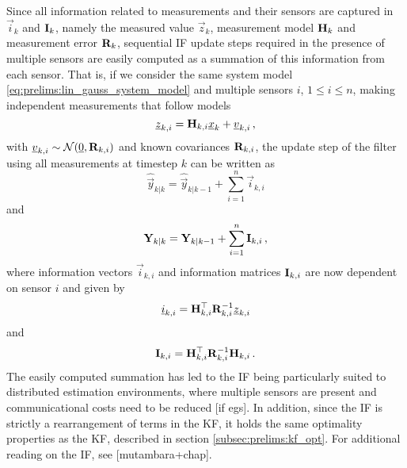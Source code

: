 Since all information related to measurements and their sensors are captured in $\vec{i}_k$ and ${{\mathbf{I}}}_k$, namely the measured value $\vec{z}_k$, measurement model ${{\mathbf{H}}}_k$ and measurement error ${{\mathbf{R}}}_k$, sequential IF update steps required in the presence of multiple sensors are easily computed as a summation of this information from each sensor. That is, if we consider the same system model \eqref{eq:prelims:lin_gauss_system_model} and multiple sensors $i$, $1\leq i\leq n$, making independent measurements that follow models
\begin{equation}
    {\underline{z}}_{k,i} = {{\mathbf{H}}}_{k,i} {\underline{x}}_k + {\underline{v}}_{k,i}\,,
\end{equation}
with ${\underline{v}}_{k, i}\sim\mathcal{N}({\underline{0}},{{\mathbf{R}}}_{k, i})$ and known covariances ${{\mathbf{R}}}_{k, i}$, the update step of the filter using all measurements at timestep $k$ can be written as
\begin{equation}\label{eq:prelims:if_info_vec_update}
    \hat{\vec{y}}_{k|k} = \hat{\vec{y}}_{k|k-1} + \sum_{i=1}^n\vec{i}_{k,i}
\end{equation}
and
\begin{equation}\label{eq:prelims:if_info_mat_update}
    {\ensuremath{{\mathbf{Y}}}}_{k|k} = {{\mathbf{Y}}}_{k|k-1} + \sum_{i=1}^n{{\mathbf{I}}}_{k,i}\,,
\end{equation}
where information vectors $\vec{i}_{k,i}$ and information matrices ${{\mathbf{I}}}_{k,i}$ are now dependent on sensor $i$ and given by
\begin{equation}\label{eq:prelims:if_measurement_vec_defn}
    {\underline{i}}_{k,i} = {{\mathbf{H}}}_{k,i}^\top{\ensuremath{{\mathbf{R}}}}_{k,i}^{-1}{\underline{z}}_{k,i}
\end{equation}
and
\begin{equation}\label{eq:prelims:if_measurement_mat_defn}
    {\ensuremath{{\mathbf{I}}}}_{k,i} = {{\mathbf{H}}}_{k,i}^\top{\ensuremath{{\mathbf{R}}}}_{k,i}^{-1}{{\mathbf{H}}}_{k,i}\,.
\end{equation}
The easily computed summation has led to the IF being particularly suited to distributed estimation environments, where multiple sensors are present and communicational costs need to be reduced [if egs]. In addition, since the IF is strictly a rearrangement of terms in the KF, it holds the same optimality properties as the KF, described in section \ref{subsec:prelims:kf_opt}. For additional reading on the IF, see [mutambara+chap].

% 
% 

